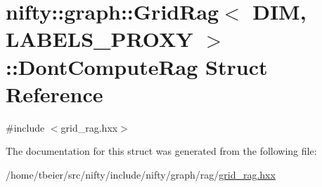 \hypertarget{structnifty_1_1graph_1_1GridRag_1_1DontComputeRag}{}\section{nifty\+:\+:graph\+:\+:Grid\+Rag$<$ D\+IM, L\+A\+B\+E\+L\+S\+\_\+\+P\+R\+O\+XY $>$\+:\+:Dont\+Compute\+Rag Struct Reference}
\label{structnifty_1_1graph_1_1GridRag_1_1DontComputeRag}


{\ttfamily \#include $<$grid\+\_\+rag.\+hxx$>$}



The documentation for this struct was generated from the following file\+:\begin{DoxyCompactItemize}
\item 
/home/tbeier/src/nifty/include/nifty/graph/rag/\hyperlink{grid__rag_8hxx}{grid\+\_\+rag.\+hxx}\end{DoxyCompactItemize}
